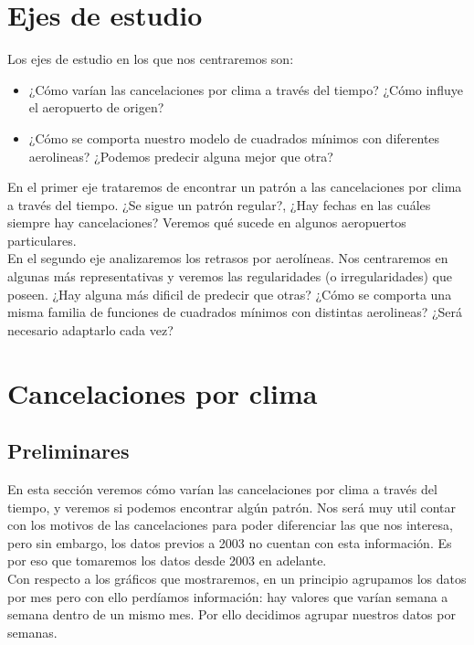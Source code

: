 \section{Ejes de estudio}

Los ejes de estudio en los que nos centraremos son:
\begin{itemize}
    \item ¿Cómo varían las cancelaciones por clima a través del tiempo? ¿Cómo influye el aeropuerto de origen?
    \item ¿Cómo se comporta nuestro modelo de cuadrados mínimos con diferentes aerolineas? ¿Podemos predecir alguna mejor que otra?
\end{itemize}


En el primer eje trataremos de encontrar un patrón a las cancelaciones por clima a través del tiempo. ¿Se sigue un patrón regular?, ¿Hay fechas en las cuáles siempre hay cancelaciones? Veremos qué sucede en algunos aeropuertos particulares. \\

En el segundo eje analizaremos los retrasos por aerolíneas. Nos centraremos en algunas más representativas y veremos las regularidades (o irregularidades) que poseen. ¿Hay alguna más dificil de predecir que otras? ¿Cómo se comporta una misma familia de funciones de cuadrados mínimos con distintas aerolineas? ¿Será necesario adaptarlo cada vez? \\

\section{Cancelaciones por clima}

\subsection{Preliminares}

En esta sección veremos cómo varían las cancelaciones por clima a través del tiempo, y veremos si podemos encontrar algún patrón. Nos será muy util contar con los motivos de las cancelaciones para poder diferenciar las que nos interesa, pero sin embargo, los datos previos a 2003 no cuentan con esta información. Es por eso que tomaremos los datos desde 2003 en adelante. \\

Con respecto a los gráficos que mostraremos, en un principio agrupamos los datos por mes pero con ello perdíamos información: hay valores que varían semana a semana dentro de un mismo mes. Por ello decidimos agrupar nuestros datos por semanas. \\


